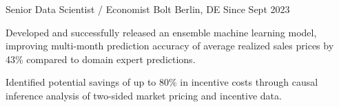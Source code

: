 
\begin{section}[Experience]

  \entry%
    {Senior Data Scientist / Economist} %
    {Bolt} %
    {Berlin, DE} %
    {Since Sept 2023} %
    {%
    \begin{entrylist}
      \item Developed and successfully released an ensemble machine learning model, improving multi-month prediction accuracy of average realized sales prices by 43\% compared to domain expert predictions.
      \item Identified potential savings of up to 80\% in incentive costs through causal inference analysis of two-sided market pricing and incentive data.
    \end{entrylist}
    }%
  

\end{section}

